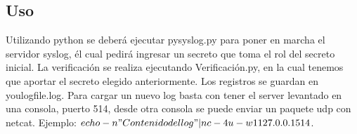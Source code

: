 \subsection{Uso}
Utilizando python se deberá ejecutar pysyslog.py para poner en marcha el servidor syslog, él cual pedirá ingresar un secreto que toma el rol del secreto inicial. La verificación se realiza ejecutando Verificación.py, en la cual tenemos que aportar el secreto elegido anteriormente. Los registros se guardan en youlogfile.log. Para cargar un nuevo log basta con tener el server levantado en una consola, puerto 514, desde otra consola se puede enviar un paquete udp con netcat. Ejemplo: $echo -n "Contenido del log" | nc -4u -w1 127.0.0.1 514$.
